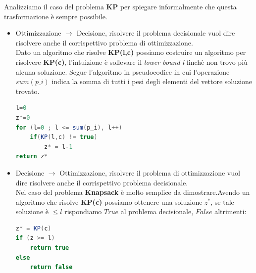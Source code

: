 \documentclass[a4paper]{article}
\begin{document}
Analizziamo il caso del problema \textbf{KP} per spiegare informalmente che questa trasformazione è sempre possibile.
\begin{itemize}
	\item Ottimizzazione $\rightarrow$ Decisione, risolvere il problema decisionale vuol dire risolvere anche il corrispettivo problema di ottimizzazione.\\
	Dato un algoritmo che risolve \textbf{KP(l,c)} possiamo costruire un algoritmo per risolvere \textbf{KP(c)}, l'intuizione è sollevare il \textit{lower bound l} finchè non trovo più alcuna soluzione.
Segue l'algoritmo in pseudocodice in cui l'operazione $sum(p\_i)$ indica la somma di tutti i pesi degli elementi del vettore soluzione trovato.
\begin{lstlisting}[xleftmargin=15pt, language=Java ]
l=0
z*=0
for (l=0 ; l <= sum(p_i), l++)
    if(KP(l,c) != true)
        z* = l-1
return z*
\end{lstlisting}
\item Decisione $\rightarrow$ Ottimizzazione, risolvere il problema di ottimizzazione vuol dire risolvere anche il corrispettivo problema decisionale.\\
	Nel caso del problema \textbf{Knapsack} è molto semplice da dimostrare.Avendo un algoritmo che risolve \textbf{KP(c)} possiamo ottenere una soluzione $z^*$, se tale soluzione è $\leq l$ rispondiamo $True$ al problema decisionale, $False$ altrimenti:

\begin{lstlisting}[xleftmargin=15pt, language=Java ]
z* = KP(c)
if (z >= l)
    return true
else
    return false
\end{lstlisting}
\end{itemize}
\end{document}
